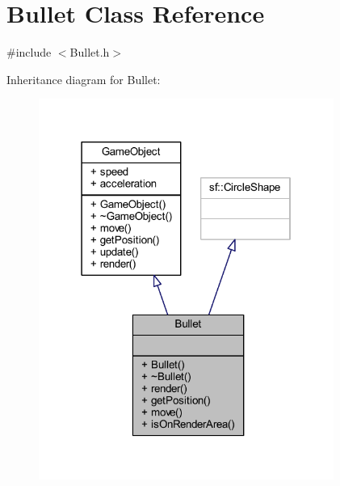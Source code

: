 \hypertarget{class_bullet}{}\section{Bullet Class Reference}
\label{class_bullet}


{\ttfamily \#include $<$Bullet.\+h$>$}



Inheritance diagram for Bullet\+:\nopagebreak
\begin{figure}[H]
\begin{center}
\leavevmode
\includegraphics[width=274pt]{class_bullet__inherit__graph}
\end{center}
\end{figure}


